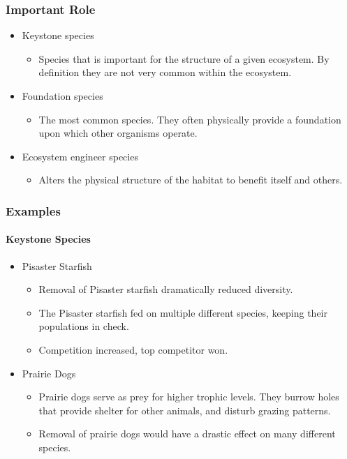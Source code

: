 \documentclass[12pt]{article}
\begin{document}
\subsubsection{Important Role}
\begin{itemize}
    \item Keystone species
          \begin{itemize}
              \item Species that is important for the structure of a given ecosystem. By definition they are not very common within the ecosystem.
          \end{itemize}
    \item Foundation species
          \begin{itemize}
              \item The most common species. They often physically provide a foundation upon which other organisms operate.
          \end{itemize}
    \item Ecosystem engineer species
          \begin{itemize}
              \item Alters the physical structure of the habitat to benefit itself and others.
          \end{itemize}
\end{itemize}

\subsubsection{Examples}

\paragraph{Keystone Species}
\begin{itemize}
    \item Pisaster Starfish
          \begin{itemize}
              \item Removal of Pisaster starfish dramatically reduced diversity.
              \item The Pisaster starfish fed on multiple different species, keeping their populations in check.
              \item Competition increased, top competitor won.
          \end{itemize}
    \item Prairie Dogs
          \begin{itemize}
              \item Prairie dogs serve as prey for higher trophic levels. They burrow holes that provide shelter for other animals, and disturb grazing patterns.
              \item Removal of prairie dogs would have a drastic effect on many different species.
          \end{itemize}
\end{itemize}
\end{document}
